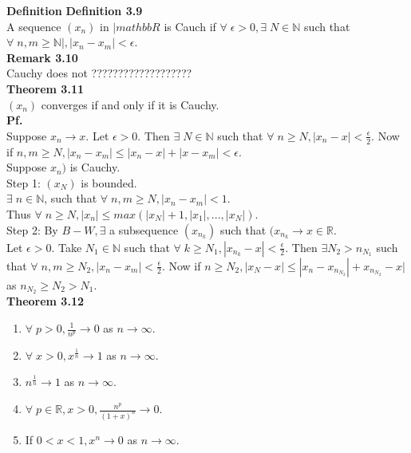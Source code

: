 \documentclass[12pt]{article}
\begin{document}
\begin{block}{\bf Definition}
\textbf{Definition 3.9}\\
A sequence $(x_n)$ in $|mathbb{R}$ is Cauch if $\forall\;\epsilon > 0, \exists \; N \in \mathbb{N}$ such that $\forall\;n,m \ge \mathbb{N}|, |x_n - x_m| < \epsilon$.\\

\textbf{Remark 3.10}\\
Cauchy does not ??????????????????? \\

\textbf{Theorem 3.11}\\
$(x_n)$ converges if and only if it is Cauchy.\\

\textbf{Pf.}\\
Suppose $x_n \rightarrow x$. Let $\epsilon > 0$. Then $\exists\; N \in \mathbb{N}$ such that $\forall\;n\ge N, |x_n - x| < \frac{\epsilon}{2}.$ Now if $n,m \ge N, |x_n - x_m| \le |x_n-x|+|x-x_m| < \epsilon.$ \\

Suppose $x_n)$ is Cauchy.\\
Step 1: $(x_N)$ is bounded.\\
$\exists\; n \in \mathbb{N}$, such that $\forall\;n,m \ge N, |x_n-x_m|<1$.\\
Thus $\forall\;n\ge N, |x_n| \le max(|x_N| +1, |x_1|,...,|x_N|)$.\\

Step 2: By $B - W, \exists$ a subsequence $(x_{n_k})$ such that $(x_{n_k} \rightarrow x \in \mathbb{R}$.\\

Let $\epsilon > 0$. Take $N_1 \in \mathbb{N}$ such that $\forall\; k\ge N_1, |x_{n_k} - x| <\frac{\epsilon}{2}.$ Then $\exists N_2 > n_{N_1}$ such that $\forall\; n,m \ge N_2, |x_n -x_m| <\frac{\epsilon}{2}.$ Now if $n \ge N_2, |x_N -x| \le |x_n -x_{n_{N_2}}| +x_{n_{N_2}} - x|$ as $n_{N_2}\ge N_2 > N_1.$\\

\textbf{Theorem 3.12}
\begin{enumerate}[label=(\roman*)]
    \item $\forall\;p>0, \frac{1}{n^p} \rightarrow 0$ as $n \rightarrow \infty$.
    \item $\forall\;x>0, x^{\frac{1}{n}} \rightarrow 1$ as $n \rightarrow \infty$.
    \item $n^{\frac{1}{n}} \rightarrow 1$ as $n \rightarrow \infty$.
    \item $\forall\; p\in \mathbb{R}, x>0, \frac{n^p}{(1+x)^n} \rightarrow 0$.
    \item If $0<x<1, x^n \rightarrow 0$ as $n \rightarrow \infty$.
\end{enumerate}


\end{block}
\end{document}

